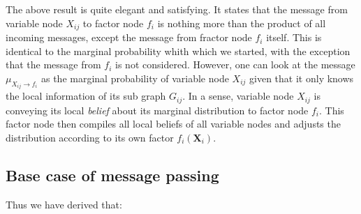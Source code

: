 \noindent
The above result is quite elegant and satisfying. It states that
the message from variable node $X_{ij}$ to factor node $f_i$ is
nothing more than the product of all incoming messages, except the
message from fractor node $f_i$ itself. This is identical to the 
marginal probability whith which we started, with the exception
that the message from $f_i$ is not considered.
However, one can look at the message
$\mu_{X_{ij} \rightarrow f_i}$ as the marginal probability of variable
node $X_{ij}$ given that it only knows the local information of its sub
graph $G_{ij}$. In a sense, variable node $X_{ij}$ is conveying its
local \textit{belief} about its marginal distribution to factor node
$f_i$. This factor node then compiles all local beliefs of all 
variable nodes and adjusts the distribution according to its own
factor $f_i(\textbf{X}_i)$.

\subsection{Base case of message passing}
Thus we have derived that:

